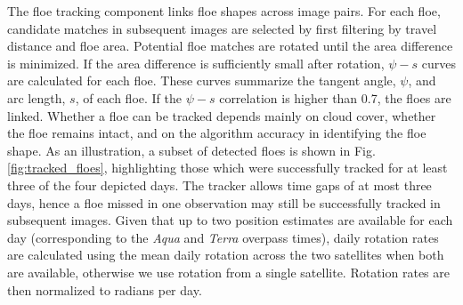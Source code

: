 \documentclass[review, jog]{igs}
\begin{document}
The floe tracking component links floe shapes across image pairs. For each floe, candidate matches in subsequent images are selected by first filtering by travel distance and floe area. Potential floe matches are rotated until the area difference is minimized. If the area difference is sufficiently small after rotation, $\psi - s$ curves \citep{kwok1990_IcemotionTracking} are calculated for each floe. These curves summarize the tangent angle, $\psi$, and arc length, $s$, of each floe. If the $\psi - s$ correlation is higher than 0.7, the floes are linked. Whether a floe can be tracked depends mainly on cloud cover, whether the floe remains intact, and on the algorithm accuracy in identifying the floe shape. As an illustration, a subset of detected floes is shown in Fig. \ref{fig:tracked_floes}, highlighting those which were successfully tracked for at least three of the four depicted days. 
The tracker allows time gaps of at most three days, hence a floe missed in one observation may still be successfully tracked in subsequent images. 
Given that up to two position estimates are available for each day (corresponding to the \textit{Aqua} and \textit{Terra} overpass times), daily rotation rates are calculated using the mean daily rotation across the two satellites when both are available, otherwise we use rotation from a single satellite.
Rotation rates are then normalized to radians per day.
\end{document}
